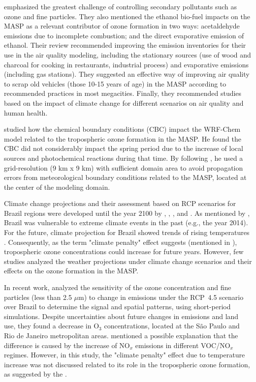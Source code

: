 \citet{Andrade2017} emphasized the greatest challenge of controlling secondary pollutants such as ozone and fine particles.
They also mentioned the ethanol bio-fuel impacts on the MASP as a relevant contributor of ozone formation in two ways: acetaldehyde emissions due to incomplete combustion; and the direct evaporative emission of ethanol.
Their review recommended improving the emission inventories for their use in the air quality modeling, including the stationary sources (use of wood and charcoal for cooking in restaurants, industrial process) and evaporative emissions (including gas stations). 
They suggested an effective way of improving air quality to scrap old vehicles (those 10-15 years of age) in the MASP according to recommended practices in most megacities.
Finally, they recommended studies based on the impact of climate change for different scenarios on air quality and human health.

\citet{Gavidia2018} studied how the chemical boundary conditions (CBC) impact the WRF-Chem model related to the tropospheric ozone formation in the MASP. 
He found the CBC did not considerably impact the spring period due to the increase of local sources and photochemical reactions during that time. 
By following \citet{Warner2011}, he used a grid-resolution (9 km x 9 km) with sufficient domain area to avoid propagation errors from meteorological boundary conditions related to the MASP, located at the center of the modeling domain.

Climate change projections and their assessment based on RCP scenarios for Brazil regions were developed until the year 2100 by \citet{Chou2014}, \citet{Cunningham2017}, \citet{Marengo2018}, and \citet{Nobre2019}.
As mentioned by \citet{Nobre2019}, Brazil was vulnerable to extreme climate events in the past (e.g., the year 2014).
For the future, climate projection for Brazil showed trends of rising temperatures \citep{Nobre2019}.
Consequently, as the term "climate penalty" effect suggests (mentioned in \citealt{IPCC2013}), tropospheric ozone concentrations could increase for future years. 
However, few studies \citep{Mazzoli2013,Schuch2020} analyzed the weather projections under climate change scenarios and their effects on the ozone formation in the MASP.

In recent work, \citet{Schuch2020} analyzed the sensitivity of the ozone concentration and fine particles (less than 2.5 $\mu$m) to change in emissions under the RCP~4.5 scenario over Brazil to determine the signal and spatial patterns, using short-period simulations.
Despite uncertainties about future changes in emissions and land use, they found a decrease in O$_3$ concentrations, located at the S\~{a}o Paulo and Rio de Janeiro metropolitan areas.
\citet{Schuch2020} mentioned a possible explanation that the difference is caused by the increase of NO$_x$ emissions in different VOC/NO$_x$ regimes.
However, in this study, the "climate penalty" effect due to temperature increase was not discussed related to its role in the tropospheric ozone formation, as suggested by the \citet{IPCC2013}.

